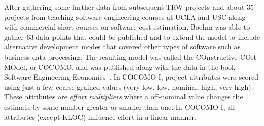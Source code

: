 \documentclass{sig-alternate}
\begin{document}




After  gathering some further data from subsequent
TRW projects and about 35 projects from teaching
software engineering courses at UCLA and USC along
with commercial short courses on software cost
estimation, Boehm was able to gather 63 data points
that could be published and to extend the model to
include alternative development modes that covered
other types of software such as business data
processing.  The resulting model was called the
COnstructive COst MOdel, or COCOMO, and was
published along with the data in the book Software
Engineering Economics~\cite{boehm81}. 
In COCOMO-I, project attributes
were scored using just a few coarse-grained values (very low,
low, nominal, high, very high). These attributes
are {\em effort multipliers} where
a off-nominal value changes the estimate by some number
greater or smaller than one.
In COCOMO-I, all attributes (except KLOC)
influence effort in a linear manner.
\end{document}
